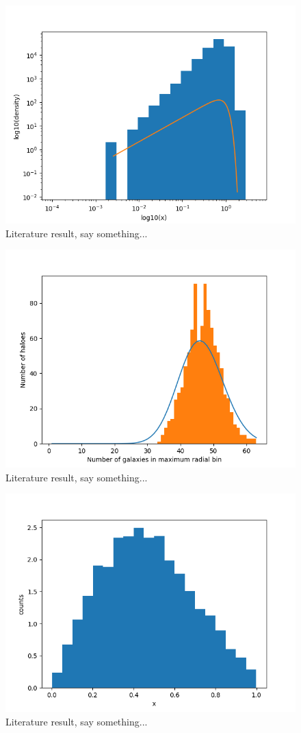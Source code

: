 \begin{figure}[h!]
  \centering
  \includegraphics[width=0.9\linewidth]{./plots/Density_profile_Haloes_Log-Log2.png}
  \caption{Literature result, say something...}
  \label{fig:fig3}
\end{figure}

\begin{figure}[h!]
  \centering
  \includegraphics[width=0.9\linewidth]{./plots/Counts_of_bins.png}
  \caption{Literature result, say something...}
  \label{fig:fig4}
\end{figure}

\begin{figure}[h!]
  \centering
  \includegraphics[width=0.9\linewidth]{./plots/Densityprofile_readin_gal.png}
  \caption{Literature result, say something...}
  \label{fig:fig5}
\end{figure}

